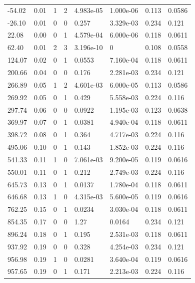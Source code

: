 \documentclass[preview]{standalone}
\begin{document}
{{\begin{tabular}{L{1.2cm}C{1.2cm} C{0.3cm}C{0.5cm} C{1.4cm}C{1.4cm} C{1.4cm}C{1.4cm}}
  -54.02  &  0.01  & 1     &  2 &  4.983e-05  & 1.000e-06  & 0.113 &  0.0586   \\ 
  -26.10  &  0.01  & 0     &  0 &  0.257  & 3.329e-03  & 0.234 &  0.121   \\ 
  22.08  &  0.00  & 0     &  1 &  4.579e-04  & 6.000e-06  & 0.118 &  0.0611   \\ 
  62.40  &  0.01  & 2     &  3 &  3.196e-10  & 0  & 0.108 &  0.0558   \\ 
  124.07  &  0.02  & 0     &  1 &  0.0553  & 7.160e-04  & 0.118 &  0.0611   \\ 
  200.66  &  0.04  & 0     &  0 &  0.176  & 2.281e-03  & 0.234 &  0.121   \\ 
  266.89  &  0.05  & 1     &  2 &  4.601e-03  & 6.000e-05  & 0.113 &  0.0586   \\ 
  269.92  &  0.05  & 0     &  1 &  0.429  & 5.558e-03  & 0.224 &  0.116   \\ 
  297.74  &  0.06  & 0     &  0 &  0.0922  & 1.195e-03  & 0.123 &  0.0638   \\ 
  369.97  &  0.07  & 0     &  1 &  0.0381  & 4.940e-04  & 0.118 &  0.0611   \\ 
  398.72  &  0.08  & 0     &  1 &  0.364  & 4.717e-03  & 0.224 &  0.116   \\ 
  495.06  &  0.10  & 0     &  1 &  0.143  & 1.852e-03  & 0.224 &  0.116   \\ 
  541.33  &  0.11  & 1     &  0 &  7.061e-03  & 9.200e-05  & 0.119 &  0.0616   \\ 
  550.01  &  0.11  & 0     &  1 &  0.212  & 2.749e-03  & 0.224 &  0.116   \\ 
  645.73  &  0.13  & 0     &  1 &  0.0137  & 1.780e-04  & 0.118 &  0.0611   \\ 
  646.68  &  0.13  & 1     &  0 &  4.315e-03  & 5.600e-05  & 0.119 &  0.0616   \\ 
  762.25  &  0.15  & 0     &  1 &  0.0234  & 3.030e-04  & 0.118 &  0.0611   \\ 
  854.35  &  0.17  & 0     &  0 &  1.27  & 0.0164  & 0.234 &  0.121   \\ 
  896.24  &  0.18  & 0     &  1 &  0.195  & 2.531e-03  & 0.118 &  0.0611   \\ 
  937.92  &  0.19  & 0     &  0 &  0.328  & 4.254e-03  & 0.234 &  0.121   \\ 
  956.98  &  0.19  & 1     &  0 &  0.0281  & 3.640e-04  & 0.119 &  0.0616   \\ 
  957.65  &  0.19  & 0     &  1 &  0.171  & 2.213e-03  & 0.224 &  0.116   \\ 

\end{tabular}}}
\end{document}

